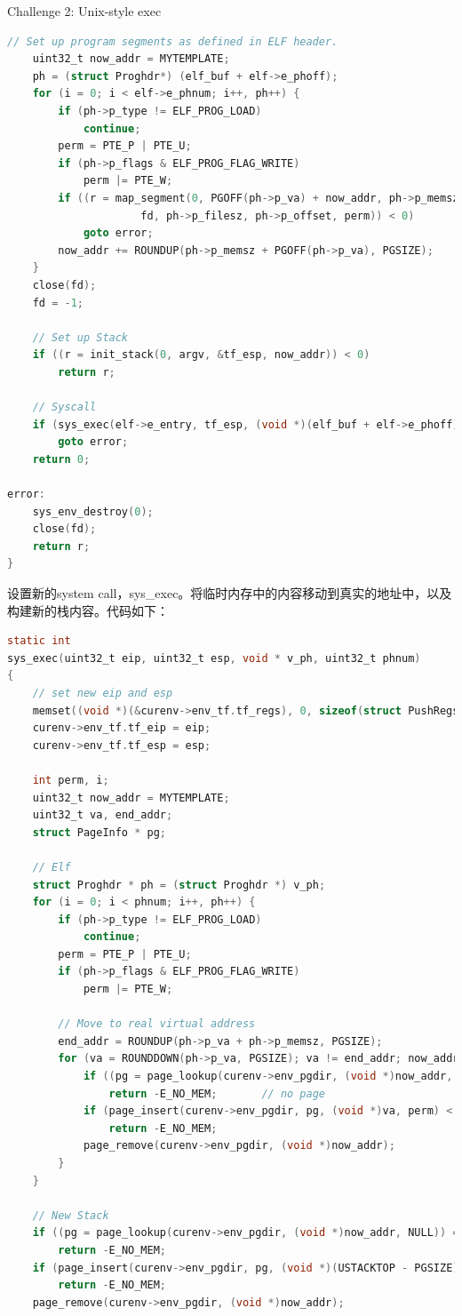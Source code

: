 \documentclass[GBK,winfonts,a4paper,10pt]{ctexart}
\begin{document}
\begin{section}{ \textcolor[rgb]{1.00,0.00,0.00}{Challenge 2: Unix-style exec} }
\begin{lstlisting}[language = C]
	// Set up program segments as defined in ELF header.
	uint32_t now_addr = MYTEMPLATE;
	ph = (struct Proghdr*) (elf_buf + elf->e_phoff);
	for (i = 0; i < elf->e_phnum; i++, ph++) {
		if (ph->p_type != ELF_PROG_LOAD)
			continue;
		perm = PTE_P | PTE_U;
		if (ph->p_flags & ELF_PROG_FLAG_WRITE)
			perm |= PTE_W;
		if ((r = map_segment(0, PGOFF(ph->p_va) + now_addr, ph->p_memsz,
				     fd, ph->p_filesz, ph->p_offset, perm)) < 0)
			goto error;
		now_addr += ROUNDUP(ph->p_memsz + PGOFF(ph->p_va), PGSIZE);
	}
	close(fd);
	fd = -1;

	// Set up Stack 
	if ((r = init_stack(0, argv, &tf_esp, now_addr)) < 0)
		return r;

	// Syscall
	if (sys_exec(elf->e_entry, tf_esp, (void *)(elf_buf + elf->e_phoff), elf->e_phnum) < 0)
		goto error;
	return 0;
	
error:
	sys_env_destroy(0);
	close(fd);
	return r;
}
\end{lstlisting}

\par
设置新的system call，sys\_exec。将临时内存中的内容移动到真实的地址中，以及构建新的栈内容。代码如下：
\begin{lstlisting}[language = C]
static int
sys_exec(uint32_t eip, uint32_t esp, void * v_ph, uint32_t phnum)
{
	// set new eip and esp
	memset((void *)(&curenv->env_tf.tf_regs), 0, sizeof(struct PushRegs));
	curenv->env_tf.tf_eip = eip;
	curenv->env_tf.tf_esp = esp;

	int perm, i;
	uint32_t now_addr = MYTEMPLATE;
	uint32_t va, end_addr;
	struct PageInfo * pg;

	// Elf 
	struct Proghdr * ph = (struct Proghdr *) v_ph; 
	for (i = 0; i < phnum; i++, ph++) {
		if (ph->p_type != ELF_PROG_LOAD)
			continue;
		perm = PTE_P | PTE_U;
		if (ph->p_flags & ELF_PROG_FLAG_WRITE)
			perm |= PTE_W;

		// Move to real virtual address
		end_addr = ROUNDUP(ph->p_va + ph->p_memsz, PGSIZE);
		for (va = ROUNDDOWN(ph->p_va, PGSIZE); va != end_addr; now_addr += PGSIZE, va += PGSIZE) {
			if ((pg = page_lookup(curenv->env_pgdir, (void *)now_addr, NULL)) == NULL) 
				return -E_NO_MEM;		// no page
			if (page_insert(curenv->env_pgdir, pg, (void *)va, perm) < 0)
				return -E_NO_MEM;		
			page_remove(curenv->env_pgdir, (void *)now_addr);
		}
	}

	// New Stack
	if ((pg = page_lookup(curenv->env_pgdir, (void *)now_addr, NULL)) == NULL) 
		return -E_NO_MEM;
	if (page_insert(curenv->env_pgdir, pg, (void *)(USTACKTOP - PGSIZE), PTE_P|PTE_U|PTE_W) < 0) 
		return -E_NO_MEM;
	page_remove(curenv->env_pgdir, (void *)now_addr);
	

\end{lstlisting}
\end{section}
\end{document}
